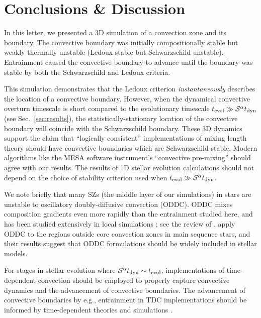 \section{Conclusions \& Discussion}
\label{sec:conclusions}

In this letter, we presented a 3D simulation of a convection zone and its boundary.
The convective boundary was initially compositionally stable but weakly thermally unstable (Ledoux stable but Schwarzschild unstable).
Entrainment caused the convective boundary to advance until the boundary was stable by both the Schwarzschild and Ledoux criteria.

This simulation demonstrates that the Ledoux criterion \emph{instantaneously} describes the location of a convective boundary.
However, when the dynamical convective overturn timescale is short compared to the evolutionary timescale $t_{\rm{evol}} \gg \mathcal{S}^{\alpha} t_{\rm{dyn}}$ (see Sec.~\ref{sec:results}), the statistically-stationary location of the convective boundary will coincide with the Schwarzschild boundary.
These 3D dynamics support the claim that ``logically consistent'' implementations of mixing length theory \citep{gabriel_etal_2014, mesa4, mesa5} should have convective boundaries which are Schwarzschild-stable.
Modern algorithms like the MESA software instrument's ``convective pre-mixing'' \citep[CPM,][]{mesa5} should agree with our results.
The results of 1D stellar evolution calculations should not depend on the choice of stability criterion used when $t_{\rm{evol}} \gg \mathcal{S}^{\alpha} t_{\rm{dyn}}$.

We note briefly that many SZs (the middle layer of our simulations) in stars are unstable to oscillatory doubly-diffusive convection (ODDC).
ODDC mixes composition gradients even more rapidly than the entrainment studied here, and has been studied extensively in local simulations \citep{mirouh_etal_2012, wood_etal_2013, xie_etal_2017}; see the review of \citet{garaud_2018}.
\citet{moore_garaud_2016} apply ODDC to the regions outside core convection zones in main sequence stars, and their results suggest that ODDC formulations should be widely included in stellar models.

For stages in stellar evolution where $\mathcal{S}^{\alpha} t_{\rm{dyn}} \sim t_{\rm{evol}}$, implementations of time-dependent convection \citep[TDC,][]{tdc_1986} should be employed to properly capture convective dynamics and the advancement of convective boundaries.
The advancement of convective boundaries by e.g., entrainment in TDC implementations should be informed by time-dependent theories and simulations \citep[e.g.,][]{turner_1968, fuentes_cumming_2020}.

